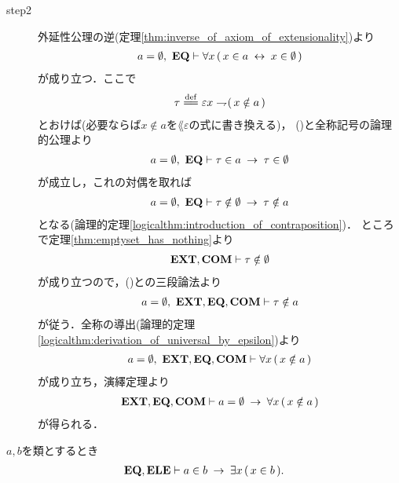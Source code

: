 \begin{prf}
\begin{description}
			\item[step2]
				外延性公理の逆(定理\ref{thm:inverse_of_axiom_of_extensionality})より
				\begin{align}
					a = \emptyset,\ \mbox{{\bf EQ}} \vdash
					\forall x\, (\, x \in a \hspace{0.25em}\leftrightarrow\hspace{0.25em} x \in \emptyset\, )
					\label{fom:uniqueness_of_emptyset_3}
				\end{align}
				が成り立つ．ここで
				\begin{align}
					\tau \defeq \varepsilon x \negation (\, x \notin a\, )
				\end{align}
				とおけば(必要ならば$x \notin a$を$\lang{\varepsilon}$の式に書き換える)，
				()と全称記号の論理的公理より
				\begin{align}
					a = \emptyset,\ \mbox{{\bf EQ}} \vdash \tau \in a \hspace{0.25em}\rightarrow\hspace{0.25em} \tau \in \emptyset
				\end{align}
				が成立し，これの対偶を取れば
				\begin{align}
					a = \emptyset,\ \mbox{{\bf EQ}} \vdash 
					\tau \notin \emptyset \hspace{0.25em}\rightarrow\hspace{0.25em} \tau \notin a
					\label{fom:uniqueness_of_emptyset_4}
				\end{align}
				となる(論理的定理\ref{logicalthm:introduction_of_contraposition})．
				ところで定理\ref{thm:emptyset_has_nothing}より
				\begin{align}
					\mbox{{\bf EXT}},\mbox{\bf COM} \vdash \tau \notin \emptyset
				\end{align}
				が成り立つので，()との三段論法より
				\begin{align}
					a = \emptyset,\ \mbox{{\bf EXT}},\mbox{{\bf EQ}},\mbox{\bf COM} \vdash \tau \notin a
				\end{align}
				が従う．全称の導出(論理的定理\ref{logicalthm:derivation_of_universal_by_epsilon})より
				\begin{align}
					a = \emptyset,\ \mbox{{\bf EXT}},\mbox{{\bf EQ}},\mbox{\bf COM} \vdash 
					\forall x\, (\, x \notin a\, )
				\end{align}
				が成り立ち，演繹定理より
				\begin{align}
					\mbox{{\bf EXT}},\mbox{{\bf EQ}},\mbox{\bf COM} \vdash 
					a = \emptyset \hspace{0.25em}\rightarrow\hspace{0.25em} \forall x\, (\, x \notin a\, )
				\end{align}
				が得られる．
				\QED
		\end{description}
	\end{prf}
	
	\begin{screen}
		\begin{thm}[類を要素として持てば空ではない]
		\label{thm:emptyset_does_not_contain_any_class}
			$a,b$を類とするとき
			\begin{align}
				\mbox{{\bf EQ}},\mbox{{\bf ELE}} \vdash a \in b \hspace{0.25em}\rightarrow\hspace{0.25em} \exists x\, (\, x \in b\, ).
			\end{align}
		\end{thm}
	\end{screen}
	
